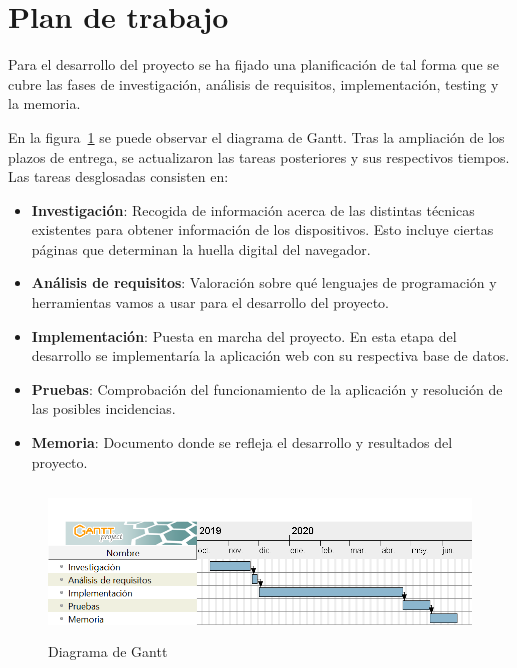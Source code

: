 \section{Plan de trabajo}
Para el desarrollo del proyecto se ha fijado una planificación de tal forma que se cubre las fases de investigación, análisis de requisitos, implementación, testing y la memoria.\par
En la figura~\ref{fig:diagramaGantt} se puede observar el diagrama de Gantt. Tras la ampliación de los plazos de entrega, se actualizaron las tareas posteriores y sus respectivos tiempos. Las tareas desglosadas consisten en:
\begin{itemize}
    \item \textbf{Investigación}: Recogida de información acerca de las distintas técnicas existentes\cite{Huella} para obtener información de los dispositivos. Esto incluye ciertas páginas que determinan la huella digital del navegador\cite{amiunique}.
    \item \textbf{Análisis de requisitos}: Valoración sobre qué lenguajes de programación y herramientas vamos a usar para el desarrollo del proyecto.
    \item \textbf{Implementación}: Puesta en marcha del proyecto. En esta etapa del desarrollo se implementaría la aplicación web con su respectiva base de datos.
    \item \textbf{Pruebas}: Comprobación del funcionamiento de la aplicación y resolución de las posibles incidencias.
    \item \textbf{Memoria}: Documento donde se refleja el desarrollo y resultados del proyecto.
\end{itemize}
\begin{figure}[b]
    \includegraphics[width=1\textwidth, height=4cm]{Images/diagramaGantt.png}
    \caption{Diagrama de Gantt}
    \label{fig:diagramaGantt}
\end{figure}

